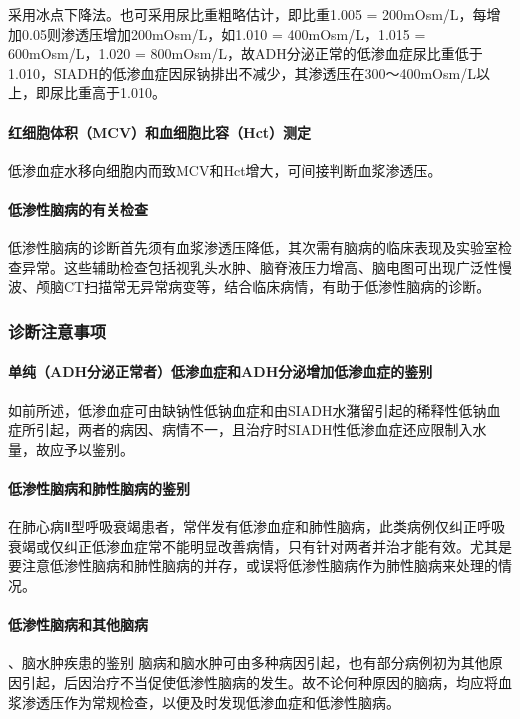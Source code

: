 采用冰点下降法。也可采用尿比重粗略估计，即比重1.005 =
200mOsm/L，每增加0.05则渗透压增加200mOsm/L，如1.010 = 400mOsm/L，1.015 =
600mOsm/L，1.020 =
800mOsm/L，故ADH分泌正常的低渗血症尿比重低于1.010，SIADH的低渗血症因尿钠排出不减少，其渗透压在300～400mOsm/L以上，即尿比重高于1.010。

\paragraph{红细胞体积（MCV）和血细胞比容（Hct）测定}

低渗血症水移向细胞内而致MCV和Hct增大，可间接判断血浆渗透压。

\paragraph{低渗性脑病的有关检查}

低渗性脑病的诊断首先须有血浆渗透压降低，其次需有脑病的临床表现及实验室检查异常。这些辅助检查包括视乳头水肿、脑脊液压力增高、脑电图可出现广泛性慢波、颅脑CT扫描常无异常病变等，结合临床病情，有助于低渗性脑病的诊断。

\subsubsection{诊断注意事项}

\paragraph{单纯（ADH分泌正常者）低渗血症和ADH分泌增加低渗血症的鉴别}

如前所述，低渗血症可由缺钠性低钠血症和由SIADH水潴留引起的稀释性低钠血症所引起，两者的病因、病情不一，且治疗时SIADH性低渗血症还应限制入水量，故应予以鉴别。

\paragraph{低渗性脑病和肺性脑病的鉴别}

在肺心病Ⅱ型呼吸衰竭患者，常伴发有低渗血症和肺性脑病，此类病例仅纠正呼吸衰竭或仅纠正低渗血症常不能明显改善病情，只有针对两者并治才能有效。尤其是要注意低渗性脑病和肺性脑病的并存，或误将低渗性脑病作为肺性脑病来处理的情况。

\paragraph{低渗性脑病和其他脑病}

、脑水肿疾患的鉴别
脑病和脑水肿可由多种病因引起，也有部分病例初为其他原因引起，后因治疗不当促使低渗性脑病的发生。故不论何种原因的脑病，均应将血浆渗透压作为常规检查，以便及时发现低渗血症和低渗性脑病。

